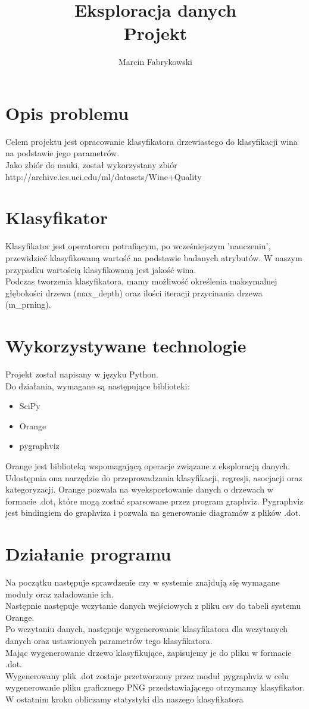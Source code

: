 \documentclass[a4paper,12pt]{article}
\author{Marcin Fabrykowski}
\title{Eksploracja danych\\Projekt}
\begin{document}
\maketitle
\newpage
\tableofcontents
\newpage
\section{Opis problemu}
Celem projektu jest opracowanie klasyfikatora drzewiastego do klasyfikacji wina na podstawie jego parametrów.\\
Jako zbiór do nauki, został wykorzystany zbiór\\
http://archive.ics.uci.edu/ml/datasets/Wine+Quality
\section{Klasyfikator}
Klasyfikator jest operatorem potrafiącym, po wcześniejszym 'nauczeniu', przewidzieć klasyfikowaną wartość na podstawie badanych atrybutów. W naszym przypadku wartością klasyfikowaną jest jakość wina.\\
Podczas tworzenia klasyfikatora, mamy możliwość określenia maksymalnej głębokości drzewa (max\_depth) oraz ilości iteracji przycinania drzewa (m\_prning).
\section{Wykorzystywane technologie}
Projekt został napisany w języku Python.\\
Do działania, wymagane są następujące biblioteki:
\begin{itemize}
\item SciPy
\item Orange
\item pygraphviz
\end{itemize}
Orange jest biblioteką wspomagającą operacje związane z eksploracją danych. Udostępnia ona narzędzie do przeprowadzania klasyfikacji, regresji, asocjacji oraz kategoryzacji. Orange pozwala na wyeksportowanie danych o drzewach w formacie .dot, które mogą zostać sparsowane przez program graphviz.
Pygraphviz jest bindingiem do graphviza i pozwala na generowanie diagramów z plików .dot.
\section{Działanie programu}
Na początku następuje sprawdzenie czy w systemie znajdują się wymagane moduły oraz załadowanie ich.\\
Następnie następuje wczytanie danych wejściowych z pliku csv do tabeli systemu Orange.\\
Po wczytaniu danych, następuje wygenerowanie klasyfikatora dla wczytanych danych oraz ustawionych parametrów tego klasyfikatora.\\
Mając wygenerowanie drzewo klasyfikujące, zapisujemy je do pliku w formacie .dot.\\
Wygenerowany plik .dot zostaje przetworzony przez moduł pygraphviz w celu wygenerowanie pliku graficznego PNG przedstawiającego otrzymamy klasyfikator.\\
W ostatnim kroku obliczamy statystyki dla naszego klasyfikatora
\end{document}
